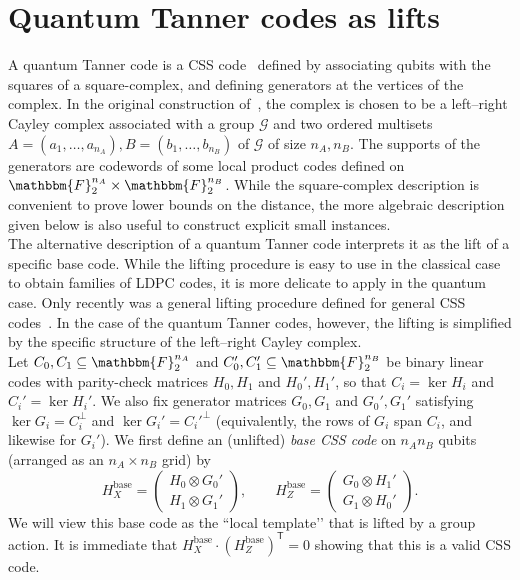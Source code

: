 \documentclass[a4paper,onecolumn,11pt]{quantumarticle}
\def\G{\mathcal{G}}
\def\F{\mathbbm{F}}
\begin{document}
\section{Quantum Tanner codes as lifts}

A quantum Tanner code is a CSS code~\cite{CS96,ste96b} defined by associating qubits with the squares of a square-complex, and defining generators at the vertices of the complex. In the original construction of~\cite{LZ22}, the complex is chosen to be a left--right Cayley complex associated with a group $\G$ and two ordered multisets  $A = (a_1, \ldots, a_{n_A}), B = (b_1, \ldots, b_{n_B})$ of $\G$ of size $n_A, n_B$. The supports of the generators are codewords of some local product codes defined on $\F_2^{n_A} \times \F_2^{n_B}$. 
While the square-complex description is convenient to prove lower bounds on the distance, the more algebraic description given below is also useful to construct explicit small instances. \\

The alternative description of a quantum Tanner code interprets it as the lift of a specific base code. 
While the lifting procedure is easy to use in the classical case to obtain families of LDPC codes, it is more delicate to apply in the quantum case. Only recently was a general lifting procedure defined for general CSS codes~\cite{gue25}. In the case of the quantum Tanner codes, however, the lifting is simplified by the specific structure of the left--right Cayley complex. \\



Let $C_0,C_1\subseteq \F_2^{n_A}$ and $C_0',C_1'\subseteq \F_2^{n_B}$ be binary linear codes with parity-check matrices $H_0,H_1$ and $H_0',H_1'$, so that $C_i=\ker H_i$ and $C_i'=\ker H_i'$.  
We also fix generator matrices $G_0,G_1$ and $G_0',G_1'$ satisfying $\ker G_i = C_i^\perp$ and $\ker G_i' = {C_i'}^\perp$ (equivalently, the rows of $G_i$ span $C_i$, and likewise for $G_i'$).
We first define an (unlifted) \emph{base CSS code} on $n_A n_B$ qubits (arranged as an $n_A\times n_B$ grid) by
\begin{equation}\label{eq:base}
H_X^{\mathrm{base}}=
\begin{pmatrix}
H_0\otimes G_0'\\
H_1\otimes G_1'
\end{pmatrix},
\qquad
H_Z^{\mathrm{base}}=
\begin{pmatrix}
G_0\otimes H_1'\\
G_1\otimes H_0'
\end{pmatrix}.
\end{equation}
We will view this base code as the “local template’’ that is lifted by a group action. It is immediate that $H^{\text{base}}_X\cdot (H^{\text{base}}_Z)^{\mathsf T}=0$ showing that this is a valid CSS code. \\
\end{document}
